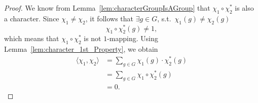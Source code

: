 \documentclass[12pt]{article}
\theoremstyle{definition}
\numberwithin{equation}{theorem}
\numberwithin{figure}{theorem}
\newcommand{\bilinearForm}[2]{\ensuremath{\langle#1,#2\rangle}}
\newcommand{\composition}[2]{\ensuremath{#1\circ#2}}
\newcommand{\sothat}{s.t.\ }
\begin{document}
    \begin{proof}
        We know from Lemma~\ref{lem:characterGroupIsAGroup} that $\composition{\chi_1}{\chi_2^{*}}$ is also a character.
        Since $\chi_1 \neq \chi_2$, it follows that $\exists g \in G$, \sothat $\chi_1(g) \neq \chi_2(g)$
        \[\composition{\chi_1}{\chi_2^{*}}(g) \neq 1,\]
        which means that $\composition{\chi_1}{\chi_2^{*}} $ is not $1$-mapping.
        Using Lemma~\ref{lem:character_1st_Property}, we obtain
        \begin{align*}
            \bilinearForm{\chi_1}{\chi_2} &= \sum_{g \in G} \chi_1(g) \cdot \chi_2^{*}(g)\\
            &= \sum_{g \in G} \composition{\chi_1}{\chi_2^{*}(g)} \\
            &= 0.
        \end{align*}
    \end{proof}
\end{document}

